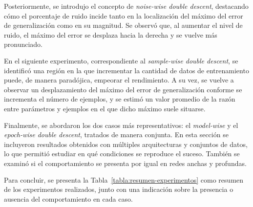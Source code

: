 Posteriormente, se introdujo el concepto de \textit{noise-wise double descent}, destacando cómo el porcentaje de ruido incide tanto en la localización del máximo del error de generalización como en su magnitud. Se observó que, al aumentar el nivel de ruido, el máximo del error se desplaza hacia la derecha y se vuelve más pronunciado.

En el siguiente experimento, correspondiente al \textit{sample-wise double descent}, se identificó una región en la que incrementar la cantidad de datos de entrenamiento puede, de manera paradójica, empeorar el rendimiento. A su vez, se vuelve a observar un desplazamiento del máximo del error de generalización conforme se incrementa el número de ejemplos, y se estimó un valor promedio de la razón entre parámetros y ejemplos en el que dicho máximo suele situarse.

Finalmente, se abordaron los dos casos más representativos: el \textit{model-wise} y el \textit{epoch-wise double descent}, tratados de manera conjunta. En esta sección se incluyeron resultados obtenidos con múltiples arquitecturas y conjuntos de datos, lo que permitió estudiar en qué condiciones se reproduce el suceso. También se examinó si el comportamiento se presenta por igual en redes anchas y profundas.

Para concluir, se presenta la Tabla~\ref{tabla:resumen-experimentos} como resumen de los experimentos realizados, junto con una indicación sobre la presencia o ausencia del comportamiento en cada caso.


